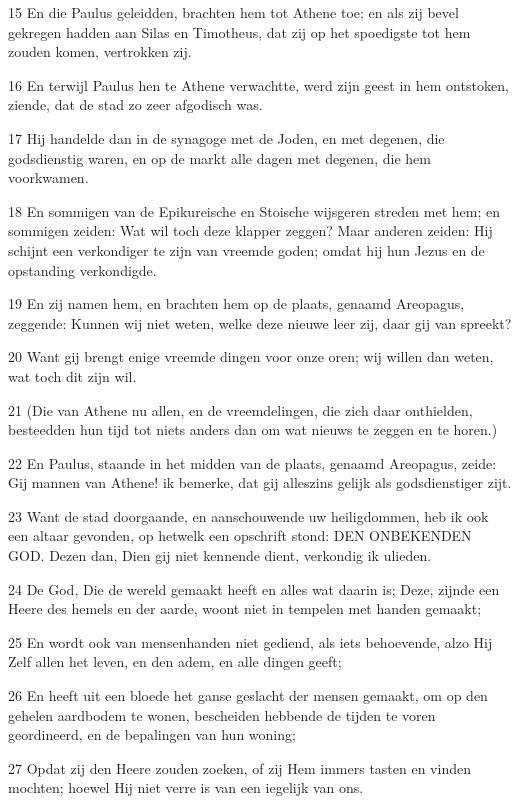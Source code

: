 \par 15 En die Paulus geleidden, brachten hem tot Athene toe; en als zij bevel gekregen hadden aan Silas en Timotheus, dat zij op het spoedigste tot hem zouden komen, vertrokken zij.
\par 16 En terwijl Paulus hen te Athene verwachtte, werd zijn geest in hem ontstoken, ziende, dat de stad zo zeer afgodisch was.
\par 17 Hij handelde dan in de synagoge met de Joden, en met degenen, die godsdienstig waren, en op de markt alle dagen met degenen, die hem voorkwamen.
\par 18 En sommigen van de Epikureische en Stoische wijsgeren streden met hem; en sommigen zeiden: Wat wil toch deze klapper zeggen? Maar anderen zeiden: Hij schijnt een verkondiger te zijn van vreemde goden; omdat hij hun Jezus en de opstanding verkondigde.
\par 19 En zij namen hem, en brachten hem op de plaats, genaamd Areopagus, zeggende: Kunnen wij niet weten, welke deze nieuwe leer zij, daar gij van spreekt?
\par 20 Want gij brengt enige vreemde dingen voor onze oren; wij willen dan weten, wat toch dit zijn wil.
\par 21 (Die van Athene nu allen, en de vreemdelingen, die zich daar onthielden, besteedden hun tijd tot niets anders dan om wat nieuws te zeggen en te horen.)
\par 22 En Paulus, staande in het midden van de plaats, genaamd Areopagus, zeide: Gij mannen van Athene! ik bemerke, dat gij alleszins gelijk als godsdienstiger zijt.
\par 23 Want de stad doorgaande, en aanschouwende uw heiligdommen, heb ik ook een altaar gevonden, op hetwelk een opschrift stond: DEN ONBEKENDEN GOD. Dezen dan, Dien gij niet kennende dient, verkondig ik ulieden.
\par 24 De God, Die de wereld gemaakt heeft en alles wat daarin is; Deze, zijnde een Heere des hemels en der aarde, woont niet in tempelen met handen gemaakt;
\par 25 En wordt ook van mensenhanden niet gediend, als iets behoevende, alzo Hij Zelf allen het leven, en den adem, en alle dingen geeft;
\par 26 En heeft uit een bloede het ganse geslacht der mensen gemaakt, om op den gehelen aardbodem te wonen, bescheiden hebbende de tijden te voren geordineerd, en de bepalingen van hun woning;
\par 27 Opdat zij den Heere zouden zoeken, of zij Hem immers tasten en vinden mochten; hoewel Hij niet verre is van een iegelijk van ons.
